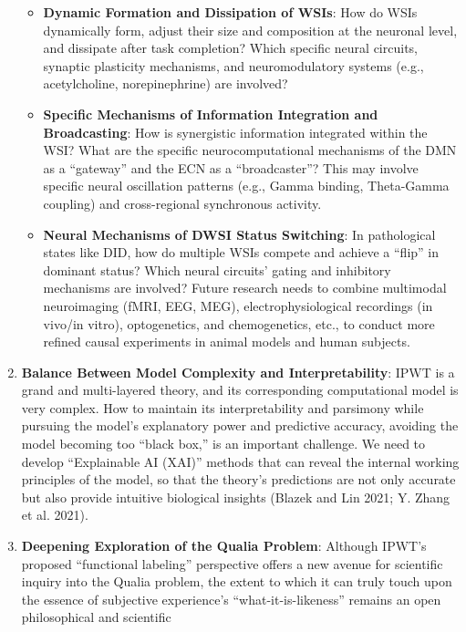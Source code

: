 \documentclass[
  a4paper]{article}
\providecommand{\tightlist}{%
  \setlength{\itemsep}{0pt}\setlength{\parskip}{0pt}}
\begin{document}
\begin{enumerate}
  \begin{itemize}
  \tightlist
  \item
    \textbf{Dynamic Formation and Dissipation of WSIs}: How do WSIs
    dynamically form, adjust their size and composition at the neuronal
    level, and dissipate after task completion? Which specific neural
    circuits, synaptic plasticity mechanisms, and neuromodulatory
    systems (e.g., acetylcholine, norepinephrine) are involved?
  \item
    \textbf{Specific Mechanisms of Information Integration and
    Broadcasting}: How is synergistic information integrated within the
    WSI? What are the specific neurocomputational mechanisms of the DMN
    as a ``gateway'' and the ECN as a ``broadcaster''? This may involve
    specific neural oscillation patterns (e.g., Gamma binding,
    Theta-Gamma coupling) and cross-regional synchronous activity.
  \item
    \textbf{Neural Mechanisms of DWSI Status Switching}: In pathological
    states like DID, how do multiple WSIs compete and achieve a ``flip''
    in dominant status? Which neural circuits' gating and inhibitory
    mechanisms are involved? Future research needs to combine multimodal
    neuroimaging (fMRI, EEG, MEG), electrophysiological recordings (in
    vivo/in vitro), optogenetics, and chemogenetics, etc., to conduct
    more refined causal experiments in animal models and human subjects.
  \end{itemize}
\item
  \textbf{Balance Between Model Complexity and Interpretability}: IPWT
  is a grand and multi-layered theory, and its corresponding
  computational model is very complex. How to maintain its
  interpretability and parsimony while pursuing the model's explanatory
  power and predictive accuracy, avoiding the model becoming too ``black
  box,'' is an important challenge. We need to develop ``Explainable AI
  (XAI)'' methods that can reveal the internal working principles of the
  model, so that the theory's predictions are not only accurate but also
  provide intuitive biological insights (Blazek and Lin 2021; Y. Zhang
  et al. 2021).
\item
  \textbf{Deepening Exploration of the Qualia Problem}: Although IPWT's
  proposed ``functional labeling'' perspective offers a new avenue for
  scientific inquiry into the Qualia problem, the extent to which it can
  truly touch upon the essence of subjective experience's
  ``what-it-is-likeness'' remains an open philosophical and scientific

\end{enumerate}
\end{document}
